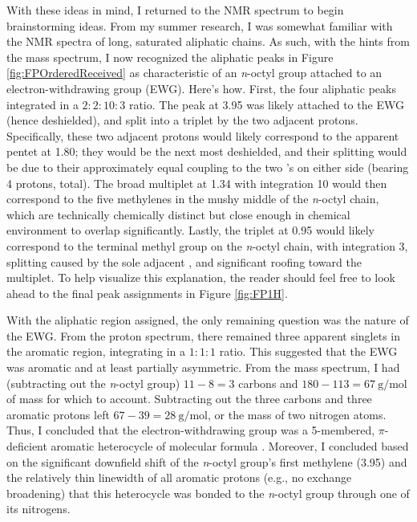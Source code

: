 \documentclass[titlepage]{article}
\begin{document}
With these ideas in mind, I returned to the  NMR spectrum to begin brainstorming ideas. From my summer research, I was somewhat familiar with the  NMR spectra of long, saturated aliphatic chains. As such, with the hints from the mass spectrum, I now recognized the aliphatic peaks in Figure \ref{fig:FPOrderedReceived} as characteristic of an \emph{n}-octyl group attached to an electron-withdrawing group (EWG). Here's how. First, the four aliphatic peaks integrated in a $2:2:10:3$ ratio. The peak at \SI{3.95}{\partspermillion} was likely attached to the EWG (hence deshielded), and split into a triplet by the two adjacent protons. Specifically, these two adjacent protons would likely correspond to the apparent pentet at \SI{1.80}{\partspermillion}; they would be the next most deshielded, and their splitting would be due to their approximately equal coupling to the two 's on either side (bearing 4 protons, total). The broad multiplet at \SI{1.34}{\partspermillion} with integration 10 would then correspond to the five methylenes in the mushy middle of the \emph{n}-octyl chain, which are technically chemically distinct but close enough in chemical environment to overlap significantly. Lastly, the triplet at \SI{0.95}{\partspermillion} would likely correspond to the terminal methyl group on the \emph{n}-octyl chain, with integration 3, splitting caused by the sole adjacent , and significant roofing toward the multiplet. To help visualize this explanation, the reader should feel free to look ahead to the final peak assignments in Figure \ref{fig:FP1H}.\par
With the aliphatic region assigned, the only remaining question was the nature of the EWG. From the proton spectrum, there remained three apparent singlets in the aromatic region, integrating in a $1:1:1$ ratio. This suggested that the EWG was aromatic and at least partially asymmetric. From the mass spectrum, I had (subtracting out the \emph{n}-octyl group) $11-8=3$ carbons and $180-113=\SI[per-mode=symbol]{67}{\gram\per\mole}$ of mass for which to account. Subtracting out the three carbons and three aromatic protons left $67-39=\SI[per-mode=symbol]{28}{\gram\per\mole}$, or the mass of two nitrogen atoms. Thus, I concluded that the electron-withdrawing group was a 5-membered, $\pi$-deficient aromatic heterocycle of molecular formula . Moreover, I concluded based on the significant downfield shift of the \emph{n}-octyl group's first methylene (\SI{3.95}{\partspermillion}) and the relatively thin linewidth of all aromatic protons (e.g., no exchange broadening) that this heterocycle was bonded to the \emph{n}-octyl group through one of its nitrogens.\par
\end{document}
